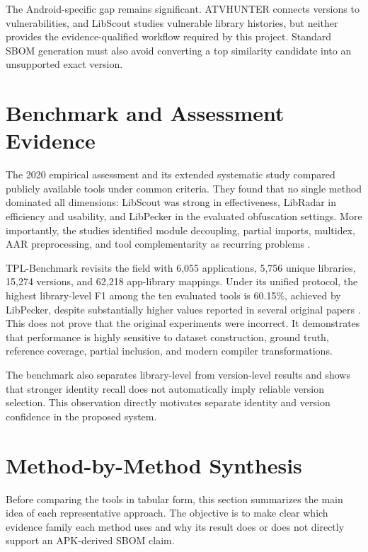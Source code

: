 The Android-specific gap remains significant. ATVHUNTER connects versions to
vulnerabilities, and LibScout studies vulnerable library histories, but
neither provides the evidence-qualified \CycloneDX workflow required by this
project. Standard SBOM generation must also avoid converting a top similarity
candidate into an unsupported exact version.

\section{Benchmark and Assessment Evidence}

The 2020 empirical assessment and its extended systematic study compared
publicly available tools under common criteria. They found that no single
method dominated all dimensions: LibScout was strong in effectiveness,
LibRadar in efficiency and usability, and LibPecker in the evaluated
obfuscation settings. More importantly, the studies identified module
decoupling, partial imports, multidex, AAR preprocessing, and tool
complementarity as recurring problems \cite{zhan2020assessment,zhan2021systematic}.

TPL-Benchmark revisits the field with 6,055 applications, 5,756 unique
libraries, 15,274 versions, and 62,218 app-library mappings. Under its unified
protocol, the highest library-level F1 among the ten evaluated tools is
60.15\%, achieved by LibPecker, despite substantially higher values reported
in several original papers \cite{gu2025tplbenchmark}. This does not prove that
the original experiments were incorrect. It demonstrates that performance is
highly sensitive to dataset construction, ground truth, reference coverage,
partial inclusion, and modern compiler transformations.

The benchmark also separates library-level from version-level results and
shows that stronger identity recall does not automatically imply reliable
version selection. This observation directly motivates separate identity and
version confidence in the proposed system.

\section{Method-by-Method Synthesis}

Before comparing the tools in tabular form, this section summarizes the main
idea of each representative approach. The objective is to make clear which
evidence family each method uses and why its result does or does not directly
support an APK-derived SBOM claim.

